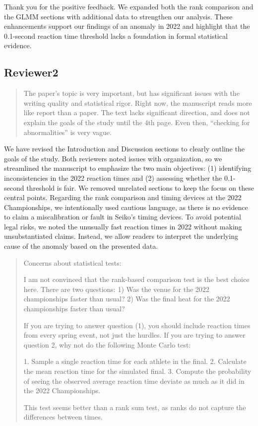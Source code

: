 \documentclass[12pt]{article}
\newenvironment{comment}%
{\begin{quotation}\noindent\small\it\color{darkblue}\ignorespaces%
}{\end{quotation}}
\begin{document}
Thank you for the positive feedback. We expanded both the rank
comparison and the GLMM sections with additional data to strengthen our
analysis. These enhancements support our findings of an anomaly in
2022 and highlight that the 0.1-second reaction time threshold lacks a
foundation in formal statistical evidence.


\subsection*{Reviewer2}


\begin{comment}
The paper’s topic is very important, but has significant issues with the writing
quality and statistical rigor. Right now, the manuscript reads more like report
than a paper. The text lacks significant direction, and does not explain the
goals of the study until the 4th page. Even then, “checking for abnormalities”
is very vague.
\end{comment}


We have revised the Introduction and Discussion sections to clearly
outline the goals of the study. Both reviewers noted issues with
organization, so we streamlined the manuscript to emphasize the two
main objectives: (1) identifying inconsistencies in the 2022 reaction
times and (2) assessing whether the 0.1-second threshold is fair. We
removed unrelated sections to keep the focus on these central
points. Regarding the rank comparison and timing devices at the 2022
Championships, we intentionally used cautious language, as there is no
evidence to claim a miscalibration or fault in Seiko’s timing
devices. To avoid potential legal risks, we noted the unusually fast
reaction times in 2022 without making unsubstantiated claims. Instead,
we allow readers to interpret the underlying cause of the anomaly
based on the presented data.


\begin{comment}
Concerns about statistical tests:

I am not convinced that the rank-based comparison test is the best choice here.
There are two questions: 1) Was the venue for the 2022 championships faster than
usual? 2) Was the final heat for the 2022 championships faster than usual?

If you are trying to answer question (1), you should include reaction times from
every spring event, not just the hurdles. If you are trying to answer question
2, why not do the following Monte Carlo test:

1. Sample a single reaction time for each athlete in the final.
2. Calculate the mean reaction time for the simulated final.
3. Compute the probability of seeing the observed average reaction time deviate
as much as it did in the 2022 Championships.

This test seems better than a rank sum test, as ranks do not capture the
differences between times.

\end{comment}
\end{document}
